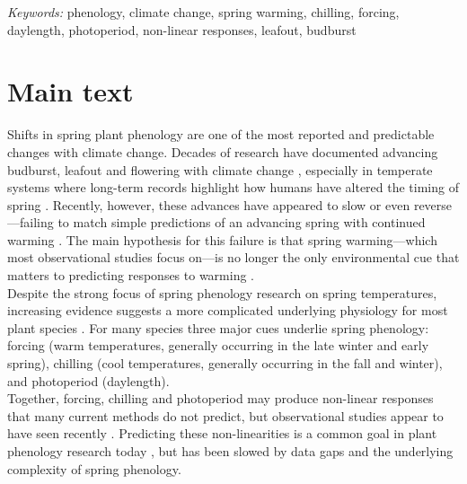 \documentclass[11pt,letter]{article}
\begin{document}
\noindent \emph{Keywords:} phenology, climate change, spring warming, chilling, forcing, daylength, photoperiod, non-linear responses, leafout, budburst\\

\newpage
\linenumbers
\section{Main text} %
Shifts in spring plant phenology are one of the most reported and predictable changes with climate change. Decades of research have documented advancing budburst, leafout and flowering with climate change \citep{delpierre2009, yu2010,Ellwood2012,jochner2013,hereford2017}, especially in temperate systems where long-term records highlight how humans have altered the timing of spring \citep{Schwartz:1997nn,Menzel2003a,menzel2006}. Recently, however, these advances have appeared to slow \citep{fu2015} or even reverse \citep{yu2010}---failing to match simple predictions of an advancing spring with continued warming \citep{Ellwood2012}. The main hypothesis for this failure is that spring warming---which most observational studies focus on---is no longer the only environmental cue that matters to predicting responses to warming \citep{chuine2016,gauzere2019}.\\

Despite the strong focus of spring phenology research on spring temperatures, increasing evidence suggests a more complicated underlying physiology for most plant species \citep[e.g.,][]{zohner2016,gauzere2019,ettinger2020}. For many species three major cues underlie spring phenology: forcing (warm temperatures, generally occurring in the late winter and early spring), chilling (cool temperatures, generally occurring in the fall and winter), and photoperiod (daylength). \\

Together, forcing, chilling and photoperiod may produce non-linear responses that many current methods do not predict, but observational studies appear to have seen recently \citep{fu2015}. Predicting these non-linearities is a common goal in plant phenology research today \citep{gusewell2017,martlusch2017,gauzere2019,chen2019,keenan2019}, but has been slowed by data gaps and the underlying complexity of spring phenology. \\
\end{document}
